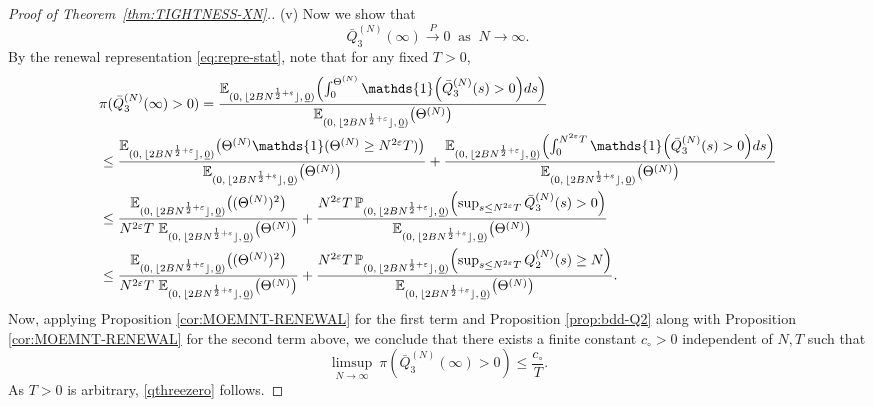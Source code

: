 \documentclass[11pt, reqno]{article}
\DeclarePairedDelimiter\autobracket{(}{)}
\newcommand{\br}[1]{\autobracket*{#1}}
\numberwithin{equation}{section}
\numberwithin{theorem}{section}
\newcommand\blue[1]{#1}
\begin{document}
\begin{proof}[Proof of Theorem~\ref{thm:TIGHTNESS-XN}.]
(v) Now we show that 
\begin{equation}\label{qthreezero}
\bar{Q}^{(N)}_3(\infty) \xrightarrow{P} 0 \ \mbox{ as } \ N \rightarrow \infty.
\end{equation}
By the renewal representation \eqref{eq:repre-stat}, note that for any fixed $T>0$,
\begin{align*}
&\pi(\bar{Q}^{(N)}_3(\infty)>0) =\frac{\mathbb{E}_{(0, \, \lfloor 2BN^{\frac{1}{2}+\varepsilon} \rfloor, \,\underline{0})}\br{\int_0^{\Theta^{(N)}}\mathds{1}\br{\bar{Q}^{(N)}_3(s)>0}ds}}{\mathbb{E}_{(0, \, \lfloor 2BN^{\frac{1}{2}+\varepsilon} \rfloor, \,\underline{0})}\br{\Theta^{(N)}}}\\
&\le \frac{\mathbb{E}_{(0, \, \lfloor 2BN^{\frac{1}{2}+\varepsilon} \rfloor, \,\underline{0})}\br{\Theta^{(N)} \mathds{1}(\Theta^{(N)} \ge N^{2\varepsilon}T)}}{\mathbb{E}_{(0, \, \lfloor 2BN^{\frac{1}{2}+\varepsilon} \rfloor, \,\underline{0})}\br{\Theta^{(N)}}}
+ \frac{\mathbb{E}_{(0, \, \lfloor 2BN^{\frac{1}{2}+\varepsilon} \rfloor, \,\underline{0})}\br{\int_0^{N^{2\varepsilon}T}\mathds{1}\br{\bar{Q}^{(N)}_3(s)>0}ds}}{\mathbb{E}_{(0, \, \lfloor 2BN^{\frac{1}{2}+\varepsilon} \rfloor, \,\underline{0})}\br{\Theta^{(N)}}}\\
&\le \frac{\mathbb{E}_{(0, \, \lfloor 2BN^{\frac{1}{2}+\varepsilon} \rfloor, \,\underline{0})}\br{\blue{(\Theta^{(N)})^2}}}{N^{2\varepsilon}T \ \mathbb{E}_{(0, \, \lfloor 2BN^{\frac{1}{2}+\varepsilon} \rfloor, \,\underline{0})}\br{\Theta^{(N)}}}
+ \frac{N^{2\varepsilon}T \, \mathbb{P}_{(0, \, \lfloor 2BN^{\frac{1}{2}+\varepsilon} \rfloor, \,\underline{0})}\br{\sup_{s \le N^{2\varepsilon}T}\bar{Q}^{(N)}_3(s)>0}}{\mathbb{E}_{(0, \, \lfloor 2BN^{\frac{1}{2}+\varepsilon} \rfloor, \,\underline{0})}\br{\Theta^{(N)}}}\\
&\le \frac{\mathbb{E}_{(0, \, \lfloor 2BN^{\frac{1}{2}+\varepsilon} \rfloor, \,\underline{0})}\br{\blue{(\Theta^{(N)})^2}}}{N^{2\varepsilon}T \ \mathbb{E}_{(0, \, \lfloor 2BN^{\frac{1}{2}+\varepsilon} \rfloor, \,\underline{0})}\br{\Theta^{(N)}}}
+ \frac{N^{2\varepsilon}T \, \mathbb{P}_{(0, \, \lfloor 2BN^{\frac{1}{2}+\varepsilon} \rfloor, \,\underline{0})}\br{\sup_{s \le N^{2\varepsilon}T}Q^{(N)}_2(s)\ge N}}{\mathbb{E}_{(0, \, \lfloor 2BN^{\frac{1}{2}+\varepsilon} \rfloor, \,\underline{0})}\br{\Theta^{(N)}}}.
\end{align*}
Now, applying Proposition \ref{cor:MOEMNT-RENEWAL} for the first term and Proposition \ref{prop:bdd-Q2} along with Proposition \ref{cor:MOEMNT-RENEWAL} for the second term above, we conclude that there exists a finite constant $c_\circ>0$ independent of $N,T$ such that
$$
\limsup_{N \rightarrow \infty} \ \pi(\bar{Q}^{(N)}_3(\infty)>0) \le \frac{c_\circ}{T}.
$$
As $T>0$ is arbitrary, \eqref{qthreezero} follows.

\end{proof}
\end{document}
